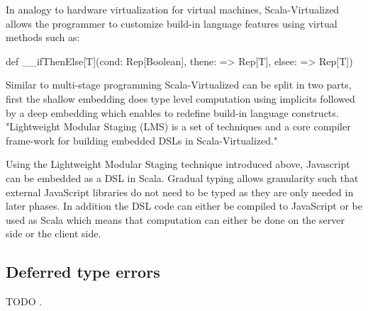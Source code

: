 In analogy to hardware virtualization for virtual machines, Scala-Virtualized allows the programmer to customize build-in language features using virtual methods such as:

\begin{lstlisting-nobreak}
def __ifThenElse[T](cond: Rep[Boolean], thene: => Rep[T], elsee: => Rep[T])
\end{lstlisting-nobreak}

Similar to multi-stage programming Scala-Virtualized can be split in two parts, first the shallow embedding does type level computation using implicits followed by a deep embedding which enables to redefine build-in language constructs. "Lightweight Modular Staging (LMS) is a set of techniques and a core compiler frame-work for building embedded DSLs in Scala-Virtualized."

Using the Lightweight Modular Staging technique introduced above, Javascript can be embedded as a DSL in Scala. Gradual typing allows granularity such that external JavaScript libraries do not need to be typed as they are only needed in later phases. In addition the DSL code can either be compiled to JavaScript or be used as Scala which means  that computation can either be done on the server side or the client side.

\subsection{Deferred type errors}

TODO \cite{haskell-deferred-type-errors}.

\newcommand{\DS}{\begin{sideways}DuctileScala\end{sideways}}
\newcommand{\hask}{\begin{sideways}Haskell\end{sideways}}
\newcommand{\dyn}{\begin{sideways}Dynamic trait\end{sideways}}
\newcommand{\SV}{\begin{sideways}Scala-Virtualized\end{sideways}}
\newcommand{\dart}{\begin{sideways}Dart\end{sideways}}
\newcommand{\DL}{\begin{sideways}dynamic languages\end{sideways}}
\newcommand{\SJS}{\begin{sideways}Scala-JS interoperatability\end{sideways}}
\newcommand{\JSLMS}{\begin{sideways}JS on LMS\end{sideways}}
\newcommand{\SD}{\begin{sideways}ScalaDyno\end{sideways}}

